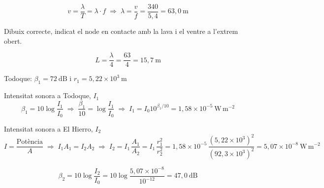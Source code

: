 \begin{solapartat}
 \[ v = \frac{\lambda}{T} = \lambda\cdot f \;\Rightarrow\; \lambda = \frac{v}{f} = \frac{340}{5,4} = 63,0\ \mathrm{m} \]

 Dibuix correcte, indicat el node en contacte amb la lava i el ventre a l'extrem obert.


 \[ L = \frac{\lambda}{4} = \frac{63}{4} = 15,7\ \mathrm{m} \]
\end{solapartat}

\begin{solapartat}
Todoque: $\beta_1 = 72\ \mathrm{dB}$ i $r_1 = 5,22\times 10^{3}\ \mathrm{m}$

 Intensitat sonora a Todoque, $I_1$
\[ \beta_1 = 10\log\frac{I_1}{I_0} \;\Rightarrow\; \frac{\beta_1}{10} = \log\frac{I_1}{I_0} \;\Rightarrow\; I_1 = I_0 10^{\beta_1/10} = 1,58\times 10^{-5}\ \mathrm{W\,m^{-2}} \]

 Intensitat sonora a El Hierro, $I_2$
\[ I = \frac{\text{Potència}}{A} \;\Rightarrow\; I_1 A_1 = I_2 A_2 \;\Rightarrow\; I_2 = I_1\,\frac{A_1}{A_2} = I_1\,\frac{r_1^2}{r_2^2} = 1,58\times 10^{-5}\,\frac{(5,22\times 10^{3})^2}{(92,3\times 10^{3})^2} = 5,07\times 10^{-8}\ \mathrm{W\,m^{-2}} \]

 \[ \beta_2 = 10\log\frac{I_2}{I_0} = 10\log\frac{5,07\times 10^{-8}}{10^{-12}} = 47,0\ \mathrm{dB} \]
\end{solapartat}
